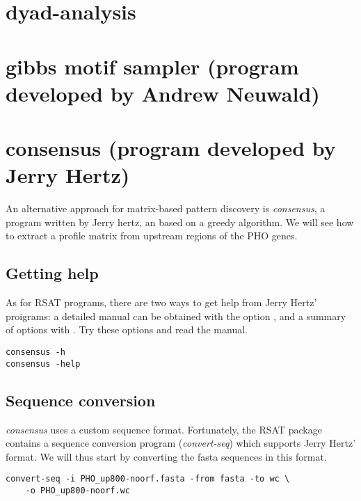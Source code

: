 \section{dyad-analysis}



\section{gibbs motif sampler (program developed by Andrew Neuwald)}




\section{consensus (program developed by Jerry Hertz)}

An alternative approach for matrix-based pattern discovery is
\textit{consensus}, a program written by Jerry hertz, an based on a
greedy algorithm. We will see how to extract a profile matrix from
upstream regions of the PHO genes.

\subsection{Getting help}

As for RSAT programs, there are two ways to get help from Jerry Hertz'
proigrams: a detailed manual can be obtained with the option
, and a summary of options with . Try these
options and read the manual.

{\color{Blue} \begin{footnotesize} 
\begin{verbatim}
consensus -h
consensus -help
\end{verbatim} \end{footnotesize}
}


\subsection{Sequence conversion}


\textit{consensus} uses a custom sequence format. Fortunately, the RSAT
package contains a sequence conversion program (\textit{convert-seq})
which supports Jerry Hertz' format. We will thus start by converting
the fasta sequences in this format. 

{\color{Blue} \begin{footnotesize} 
\begin{verbatim}
convert-seq -i PHO_up800-noorf.fasta -from fasta -to wc \ 
    -o PHO_up800-noorf.wc
\end{verbatim} \end{footnotesize}
}


